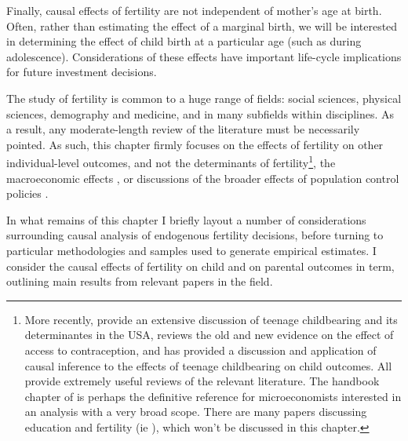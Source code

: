 Finally, causal effects of fertility are not independent of mother's age at 
birth.  Often, rather than estimating the effect of a marginal birth, we will be
interested in determining the effect of child birth at a particular age (such as
during adolescence).  Considerations of these effects have important life-cycle
implications for future investment decisions.

The study of fertility is common to a huge range of fields: social sciences, 
physical sciences, demography and medicine, and in many subfields within 
disciplines.  As a result, any moderate-length review of the literature must
be necessarily pointed.  As such, this chapter firmly focuses on the effects
of fertility on other individual-level outcomes, and not the determinants of
fertility\footnote{More recently, \citet{KearneyLevine2012} provide an extensive 
discussion of teenage childbearing and its determinantes in the USA, 
\citet{Bailey2013} reviews the old and new evidence on the effect of access to 
contraception, and \citet{Moffitt2005} has provided a discussion and application 
of causal inference to the effects of teenage childbearing on child outcomes. All
provide extremely useful reviews of the relevant literature.  The handbook chapter
of \citet{Schultz2008} is perhaps the definitive reference for microeconomists
interested in an analysis with a very broad scope.  There are many papers
discussing education and fertility (ie \citet{Blacketal2008}), which won't be 
discussed in this chapter.}, the macroeconomic effects \citep{Enke1966,Enke1971}, 
or discussions of the broader effects of population control policies
\citep{GMiller2009,RosenzweigWolpin1986}.

In what remains of this chapter I briefly layout a number of considerations
surrounding causal analysis of endogenous fertility decisions, before turning to
particular methodologies and samples used to generate empirical estimates.  I
consider the causal effects of fertility on child and on parental outcomes in
term, outlining main results from relevant papers in the field.

